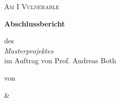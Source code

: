\begin{titlepage}
    \centering
    \par\vspace{3cm}
    {\scshape\huge Am I Vulnerable\par}
    \vspace{1.5cm}
    {\Huge\bfseries Abschlussbericht\par}
    \vspace{2cm}
    {\Large des\\\textit{Masterprojektes}\\im Auftrag von Prof. Andreas Both\par}
    \vspace{12cm}
    von\par
    \autorFirstNameK \textsc{ \autorFamilyNameK} \par
    \& \par
    \autorFirstNameT \textsc{ \autorFamilyNameT} \par
    \vfill
\end{titlepage}
